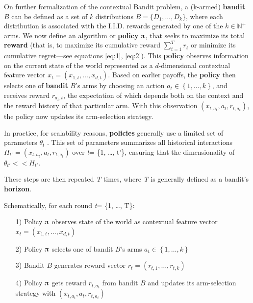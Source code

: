 \documentclass{jss}\usepackage[]{graphicx}\usepackage[]{color}
\begin{document}
On further formalization of the contextual Bandit problem, a (k-armed) \textbf{bandit} $B$ can be defined as a set of $k$ distributions $B=\{D_{1},\dots ,D_{k}\}$, where each distribution is associated with the I.I.D. rewards generated by one of the $k\in \mathbb {N} ^{+}$ arms. We now define an algorithm or \textbf{policy} $\piup$, that seeks to maximize its total \textbf{reward} (that is, to maximize its cumulative reward $\sum_{t=1}^T r_t$ or minimize its cumulative regret---see equations \ref{eq:1}, \ref{eq:2}). This \textbf{policy} observes information on the current state of the world represented as a $d$-dimensional contextual feature vector \(x_{t}=\left( x_{1,t},  \dots, x_{d,t}\right)\). Based on earlier payoffs, the \textbf{policy} then selects one of \textbf{bandit} $B$'s arms by choosing an action \(a_{t} \in \left\{ 1, \dots, k \right\}\), and receives reward \(r_{a_{t},t}\), the expectation of which depends both on the context and the reward history of that particular arm. With this observation \( (x_{t,a_t},a_{t},r_{t,a_t}) \), the policy now updates its arm-selection strategy.

In practice, for scalability reasons, \textbf{policies} generally use a limited set of parameters $\theta_{t}$ \citep{Kaptein2016}. This set of parameters summarizes all historical interactions \( H_{t'} = (x_{t,a_t},a_{t},r_{t,a_t}) \) over \emph{t}= \{1, \ldots, t'\}, ensuring that the dimensionality of $\theta_{t'} << H_{t'}$.

These steps are then repeated \textit{T} times, where \textit{T} is generally defined as a bandit's \textbf{horizon}.

Schematically, for each round \emph{t}= \{1, \ldots, T\}:

\begin{enumerate}
         \item[1)] Policy $\piup$ observes state of the world as contextual feature vector \(x_{t}=\left( x_{1,t},  \dots, x_{d,t}\right)\)
         \item[2)] Policy $\piup$ selects one of bandit $B$'s arms \(a_{t} \in \left\{ 1, \dots, k \right\}\)
         \item[3)] Bandit $B$ generates reward vector \(r_{t}=\left( r_{t,1},  \dots, r_{t,k}\right)\)
         \item[4)] Policy $\piup$ gets reward \(r_{t,a_t}\) from bandit $B$ and updates its arm-selection strategy with \( (x_{t,a_t},a_{t},r_{t,a_t}) \)
\end{enumerate}
\end{document}
